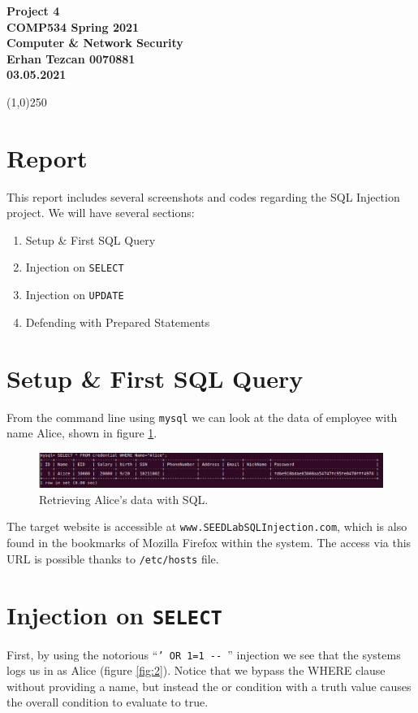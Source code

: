 \documentclass[12pt,reqno]{amsart}
\newcommand{\code}[1]{\texttt{#1}}
\begin{document}
\begin{center}
\large\textbf{Project 4 \\ COMP534 Spring 2021\\Computer \& Network Security \\}
\normalsize\textbf{ Erhan Tezcan 0070881 \\ 03.05.2021} \\
\end{center}

\begin{center}
\line(1,0){250}
\end{center}

\section*{Report}

This report includes several screenshots and codes regarding the SQL Injection project. We will have several sections:
\begin{enumerate} 
	\item Setup \& First SQL Query
	\item Injection on \code{SELECT}
	\item Injection on \code{UPDATE}
	\item Defending with Prepared Statements
\end{enumerate}

\section{Setup \& First SQL Query}

From the command line using \code{mysql} we can look at the data of employee with name Alice, shown in figure \ref{fig:1}.
\begin{figure}[h]
\includegraphics[width=\linewidth]{screenshots/SQL_Alice_Query.png}
\caption{Retrieving Alice's data with SQL.}
\label{fig:1}
\end{figure}

The target website is accessible at \code{www.SEEDLabSQLInjection.com}, which is also found in the bookmarks of Mozilla Firefox within the system. The access via this URL is possible thanks to \code{/etc/hosts} file.

\section{Injection on \code{SELECT}}
First, by using the notorious ``\code{' OR 1=1 -{}- }'' injection we see that the systems logs us in as Alice (figure \ref{fig:2}). Notice that we bypass the WHERE clause without providing a name, but instead the or condition with a truth value causes the overall condition to evaluate to true.
\end{document}
